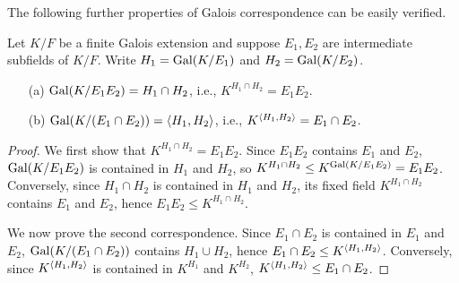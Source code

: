 The following further properties of Galois correspondence can be easily verified.
\begin{thm}\label{Galois's_thm_2}
    Let $K/F$ be a finite Galois extension and suppose $E_1, E_2$ are intermediate subfields of $K/F$.
    Write $H_1={\textrm{Gal}({K/E_1})}$ and $H_2={\textrm{Gal}({K/E_2})}$.
    \begin{enumerate}
        \item[(a)]
        {
            ${\textrm{Gal}({K/E_1E_2})}=H_1\cap H_2$, i.e., $K^{H_1\cap H_2}=E_1E_2$.
        }
        \item[(b)]
        {
            ${\textrm{Gal}({K/(E_1\cap E_2)})}={\left\langle{H_1, H_2}\right\rangle}$, i.e., $K^{{\left\langle{H_1, H_2}\right\rangle}}=E_1\cap E_2$.
        }
    \end{enumerate}
\end{thm}
\begin{proof}
    We first show that $K^{H_1\cap H_2}=E_1E_2$.
    Since $E_1E_2$ contains $E_1$ and $E_2$, ${\textrm{Gal}({K/E_1E_2})}$ is contained in $H_1$ and $H_2$, so $K^{H_1\cap H_2}\leq K^{\textrm{Gal}({K/E_1E_2})}=E_1E_2$.
    Conversely, since $H_1\cap H_2$ is contained in $H_1$ and $H_2$, its fixed field $K^{H_1\cap H_2}$ contains $E_1$ and $E_2$, hence $E_1E_2\leq K^{H_1\cap H_2}$.

    We now prove the second correspondence.
    Since $E_1\cap E_2$ is contained in $E_1$ and $E_2$, ${\textrm{Gal}({K/(E_1\cap E_2)})}$ contains $H_1\cup H_2$, hence $E_1\cap E_2\leq K^{\left\langle{H_1, H_2}\right\rangle}$.
    Conversely, since $K^{\left\langle{H_1, H_2}\right\rangle}$ is contained in $K^{H_1}$ and $K^{H_2}$, $K^{\left\langle{H_1, H_2}\right\rangle}\leq E_1\cap E_2$.
\end{proof}

